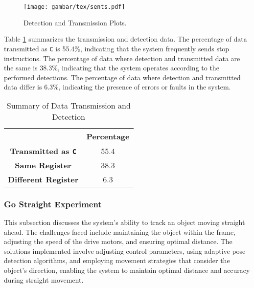 \begin{figure}[H]
    \centering
    \texttt{[image: gambar/tex/sents.pdf]}
    \caption{Detection and Transmission Plots.}
    \label{fig:detection_transmission_plots}
\end{figure}

Table \ref{tab:summary_data_transmission_detection} summarizes the transmission and detection data. The percentage of data transmitted as \texttt{C} is 55.4\%, indicating that the system frequently sends stop instructions. The percentage of data where detection and transmitted data are the same is 38.3\%, indicating that the system operates according to the performed detections. The percentage of data where detection and transmitted data differ is 6.3\%, indicating the presence of errors or faults in the system.

\begin{table}[H]
    \centering
    \caption{Summary of Data Transmission and Detection}
    \label{tab:summary_data_transmission_detection}
    \begin{tabular}{|c|c|}
        \hline 
        \cellcolor[HTML]{000000} & \cellcolor[HTML]{C0C0C0} \textbf{Percentage}   \\ \hline
        \cellcolor[HTML]{C0C0C0} \textbf{Transmitted as \texttt{C}} & 55.4  \\ \hline
        \cellcolor[HTML]{C0C0C0} \textbf{Same Register}  & 38.3 \\ \hline
        \cellcolor[HTML]{C0C0C0} \textbf{Different Register}  & 6.3 \\ \hline
    \end{tabular}
\end{table}

\vspace{5pt}
\subsubsection{Go Straight Experiment}
\label{subsubsec:gostraightexperiment}

This subsection discusses the system's ability to track an object moving straight ahead. The challenges faced include maintaining the object within the frame, adjusting the speed of the drive motors, and ensuring optimal distance. The solutions implemented involve adjusting control parameters, using adaptive pose detection algorithms, and employing movement strategies that consider the object's direction, enabling the system to maintain optimal distance and accuracy during straight movement.

